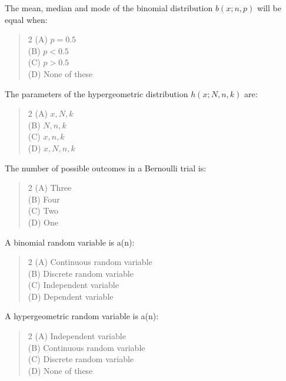 \documentclass[11pt,a4paper]{article}
\begin{document}
\begin{mcqlist}
\item The mean, median and mode of the binomial distribution $b(x;n,p)$ will be equal when:
\begin{quote}\begin{multicols}{2}
\noindent (A) $p=0.5$ \\
(B) $p<0.5$ \\
(C) $p>0.5$ \\
(D) None of these
\end{multicols}\end{quote}

\item The parameters of the hypergeometric distribution $h(x;N,n,k)$ are:
\begin{quote}\begin{multicols}{2}
\noindent (A) $x,N,k$ \\
(B) $N,n,k$ \\
(C) $x,n,k$ \\
(D) $x,N,n,k$
\end{multicols}\end{quote}

\item The number of possible outcomes in a Bernoulli trial is:
\begin{quote}\begin{multicols}{2}
\noindent (A) Three \\
(B) Four \\
(C) Two \\
(D) One
\end{multicols}\end{quote}

\item A binomial random variable is a(n):
\begin{quote}\begin{multicols}{2}
\noindent (A) Continuous random variable \\
(B) Discrete random variable \\
(C) Independent variable \\
(D) Dependent variable
\end{multicols}\end{quote}

\item A hypergeometric random variable is a(n):
\begin{quote}\begin{multicols}{2}
\noindent (A) Independent variable \\
(B) Continuous random variable \\
(C) Discrete random variable \\
(D) None of these
\end{multicols}\end{quote}


\end{mcqlist}
\end{document}
